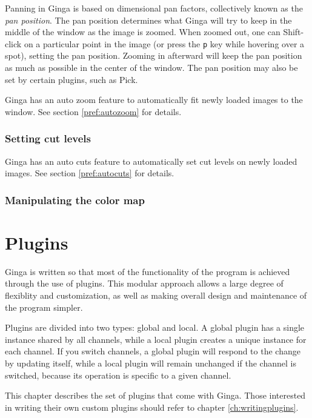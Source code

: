 \documentclass[11pt]{report}
\begin{document}
Panning in Ginga is based on dimensional pan factors, collectively known
as the \emph{pan position}.  The pan position determines what Ginga will
try to keep in the middle of the window as the image is zoomed.  
When zoomed out, one can Shift-click on a particular point in the image
(or press the {\tt p} key while hovering over a spot),
setting the pan position.  Zooming in afterward will keep the pan
position as much as possible in the center of the window.  The pan
position may also be set by certain plugins, such as Pick.

Ginga has an auto zoom feature to automatically fit newly loaded images
to the window.  See section \ref{pref:autozoom} for details.

\subsection{Setting cut levels}

Ginga has an auto cuts feature to automatically set cut levels on newly
loaded images.  See section \ref{pref:autocuts} for details.

\subsection{Manipulating the color map}


\chapter{Plugins}
\label{ch:plugins}
Ginga is written so that most of the functionality of the program is
achieved through the use of plugins.  This modular approach allows a
large degree of flexiblity and customization, as well as making overall
design and maintenance of the program simpler.

Plugins are divided into two types: global and local.  A global plugin
has a single instance shared by all channels, while a local plugin
creates a unique instance for each channel.  If you switch channels, a
global plugin will respond to the change by updating itself,
while a local plugin will remain unchanged if the channel is switched,
because its operation is specific to a given channel.

This chapter describes the set of plugins that come with Ginga.  Those
interested in writing their own custom plugins should refer to chapter
\ref{ch:writingplugins}. 
\end{document}
